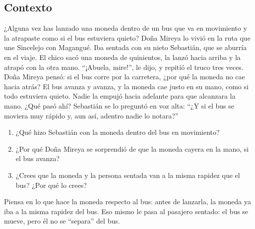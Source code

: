 \documentclass[
  spanish,
  letterpaper,
  12pt,
  oneside,
  open=any,
  DIV=15]{scrbook}
\providecommand{\tightlist}{%
  \setlength{\itemsep}{0pt}\setlength{\parskip}{0pt}}
\begin{document}
\subsection{Contexto}\label{contexto-6}

¿Alguna vez has lanzado una moneda dentro de un bus que va en movimiento
y la atrapaste como si el bus estuviera quieto? Doña Mireya lo vivió en
la ruta que une Sincelejo con Magangué. Iba sentada con su nieto
Sebastián, que se aburría en el viaje. El chico sacó una moneda de
quinientos, la lanzó hacia arriba y la atrapó con la otra mano.
``¡Abuela, mire!'', le dijo, y repitió el truco tres veces. Doña Mireya
pensó: si el bus corre por la carretera, ¿por qué la moneda no cae hacia
atrás? El bus avanza y avanza, y la moneda cae justo en su mano, como si
todo estuviera quieto. Nadie la empujó hacia adelante para que alcanzara
la mano. ¿Qué pasó ahí? Sebastián se lo preguntó en voz alta: ``¿Y si el
bus se moviera muy rápido y, aun así, adentro nadie lo notara?''

\begin{tcolorbox}[enhanced jigsaw, arc=.35mm, bottomrule=.15mm, bottomtitle=1mm, breakable, colback=white, colbacktitle=quarto-callout-note-color!10!white, colframe=quarto-callout-note-color-frame, coltitle=black, left=2mm, leftrule=.75mm, opacityback=0, opacitybacktitle=0.6, rightrule=.15mm, title=\textcolor{quarto-callout-note-color}{\faInfo}\hspace{0.5em}{Reflexiona y Conecta (Preguntas de Comprensión)}, titlerule=0mm, toprule=.15mm, toptitle=1mm]

\begin{enumerate}
\def\labelenumi{\arabic{enumi}.}
\tightlist
\item
  ¿Qué hizo Sebastián con la moneda dentro del bus en movimiento?
\item
  ¿Por qué Doña Mireya se sorprendió de que la moneda cayera en la mano,
  si el bus avanza?
\item
  ¿Crees que la moneda y la persona sentada van a la misma rapidez que
  el bus? ¿Por qué lo crees?
\end{enumerate}

\end{tcolorbox}

\begin{tcolorbox}[enhanced jigsaw, arc=.35mm, bottomrule=.15mm, bottomtitle=1mm, breakable, colback=white, colbacktitle=quarto-callout-tip-color!10!white, colframe=quarto-callout-tip-color-frame, coltitle=black, left=2mm, leftrule=.75mm, opacityback=0, opacitybacktitle=0.6, rightrule=.15mm, title=\textcolor{quarto-callout-tip-color}{\faLightbulb}\hspace{0.5em}{Apoyo Procedimental (Pista)}, titlerule=0mm, toprule=.15mm, toptitle=1mm]

Piensa en lo que hace la moneda respecto al bus: antes de lanzarla, la
moneda ya iba a la misma rapidez del bus. Eso mismo le pasa al pasajero
sentado: el bus se mueve, pero él no se ``separa'' del bus.

\end{tcolorbox}
\end{document}
